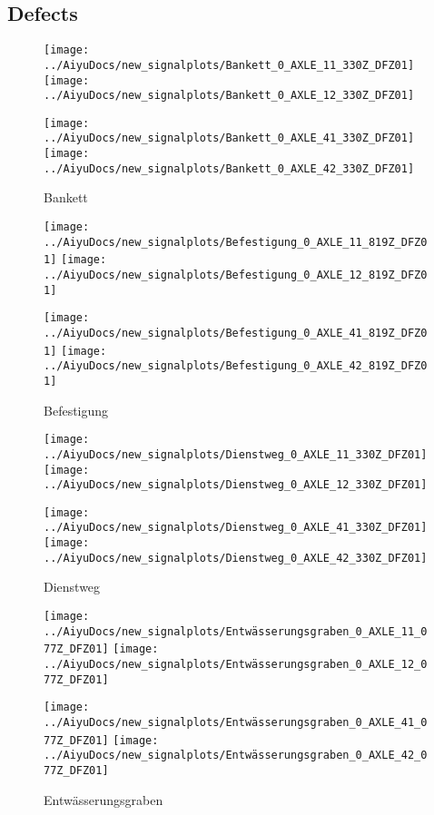 \subsection{Defects}
\begin{figure}[H]
	\centering
	\texttt{[image: ../AiyuDocs/new\_signalplots/Bankett\_0\_AXLE\_11\_330Z\_DFZ01]}
	\texttt{[image: ../AiyuDocs/new\_signalplots/Bankett\_0\_AXLE\_12\_330Z\_DFZ01]}
	
	\texttt{[image: ../AiyuDocs/new\_signalplots/Bankett\_0\_AXLE\_41\_330Z\_DFZ01]}
	\texttt{[image: ../AiyuDocs/new\_signalplots/Bankett\_0\_AXLE\_42\_330Z\_DFZ01]}
	\caption{Bankett}
\end{figure}

\begin{figure}[H]
	\centering
	\texttt{[image: ../AiyuDocs/new\_signalplots/Befestigung\_0\_AXLE\_11\_819Z\_DFZ01]}
	\texttt{[image: ../AiyuDocs/new\_signalplots/Befestigung\_0\_AXLE\_12\_819Z\_DFZ01]}
	
	\texttt{[image: ../AiyuDocs/new\_signalplots/Befestigung\_0\_AXLE\_41\_819Z\_DFZ01]}
	\texttt{[image: ../AiyuDocs/new\_signalplots/Befestigung\_0\_AXLE\_42\_819Z\_DFZ01]}
	\caption{Befestigung}
\end{figure}

\begin{figure}[H]
	\centering
	\texttt{[image: ../AiyuDocs/new\_signalplots/Dienstweg\_0\_AXLE\_11\_330Z\_DFZ01]}
	\texttt{[image: ../AiyuDocs/new\_signalplots/Dienstweg\_0\_AXLE\_12\_330Z\_DFZ01]}
	
	\texttt{[image: ../AiyuDocs/new\_signalplots/Dienstweg\_0\_AXLE\_41\_330Z\_DFZ01]}
	\texttt{[image: ../AiyuDocs/new\_signalplots/Dienstweg\_0\_AXLE\_42\_330Z\_DFZ01]}
	\caption{Dienstweg}
\end{figure}

\begin{figure}[H]
	\centering
	\texttt{[image: ../AiyuDocs/new\_signalplots/Entwässerungsgraben\_0\_AXLE\_11\_077Z\_DFZ01]}
	\texttt{[image: ../AiyuDocs/new\_signalplots/Entwässerungsgraben\_0\_AXLE\_12\_077Z\_DFZ01]}
	
	\texttt{[image: ../AiyuDocs/new\_signalplots/Entwässerungsgraben\_0\_AXLE\_41\_077Z\_DFZ01]}
	\texttt{[image: ../AiyuDocs/new\_signalplots/Entwässerungsgraben\_0\_AXLE\_42\_077Z\_DFZ01]}
	\caption{Entwässerungsgraben}
\end{figure}

